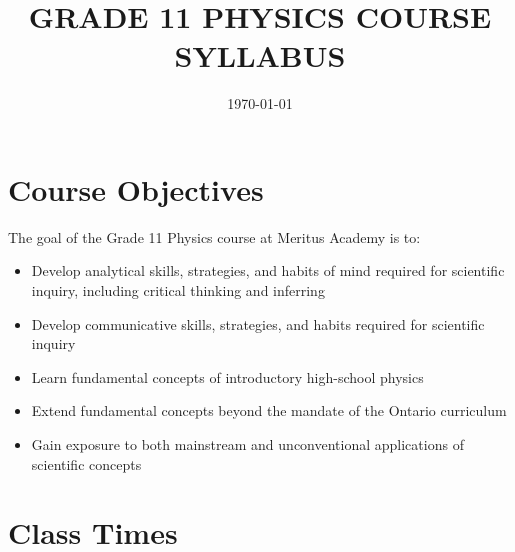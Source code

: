 \documentclass{../oss-handout}
\title{GRADE 11 PHYSICS COURSE SYLLABUS}
\author{}
\date{\today}
\begin{document}
\thispagestyle{title}
\gentitle


\section*{Course Objectives}
The goal of the Grade 11 Physics course at Meritus Academy is to:
\begin{itemize}[nosep]
\item Develop analytical skills, strategies, and habits of mind required for
  scientific inquiry, including critical thinking and inferring
\item Develop communicative skills, strategies, and habits required for
  scientific inquiry
\item Learn fundamental concepts of introductory high-school physics
\item Extend fundamental concepts beyond the mandate of the Ontario curriculum
\item Gain exposure to both mainstream and unconventional applications of
  scientific concepts
\end{itemize}


\section*{Class Times}
\end{document}
